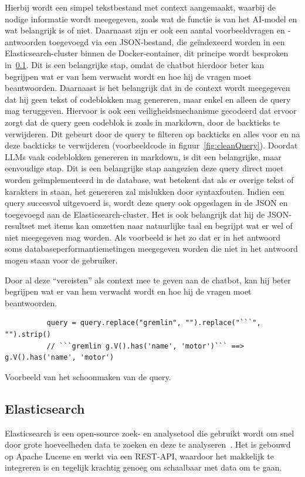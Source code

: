 Hierbij wordt een simpel tekstbestand met context aangemaakt, waarbij de nodige informatie wordt meegegeven, zoals wat de functie is van het AI-model en wat belangrijk is of niet.
Daarnaast zijn er ook een aantal voorbeeldvragen en -antwoorden toegevoegd via een JSON-bestand, die geïndexeerd worden in een Elasticsearch-cluster binnen de Docker-container, dit principe wordt besproken in~\ref{sec:Elasticsearch}.
Dit is een belangrijke stap, omdat de chatbot hierdoor beter kan begrijpen wat er van hem verwacht wordt en hoe hij de vragen moet beantwoorden.
Daarnaast is het belangrijk dat in de context wordt meegegeven dat hij geen tekst of codeblokken mag genereren, maar enkel en alleen de query mag teruggeven.
Hiervoor is ook een veiligheidsmechanisme gecodeerd dat ervoor zorgt dat de query geen codeblok is zoals in markdown, door de backticks te verwijderen.
Dit gebeurt door de query te filteren op backticks en alles voor en na deze backticks te verwijderen (voorbeeldcode in figuur~\ref{fig:cleanQuery}). Doordat LLMs vaak codeblokken genereren in markdown, is dit een belangrijke, maar eenvoudige stap.
Dit is een belangrijke stap aangezien deze query direct moet worden geïmplementeerd in de database, wat betekent dat als er overige tekst of karakters in staan, het genereren zal mislukken door syntaxfouten.
Indien een query succesvol uitgevoerd is, wordt deze query ook opgeslagen in de JSON en toegevoegd aan de Elasticsearch-cluster.
Het is ook belangrijk dat hij de JSON-resultset met items kan omzetten naar natuurlijke taal en begrijpt wat er wel of niet meegegeven mag worden.
Als voorbeeld is het zo dat er in het antwoord soms databaseperformantiemetingen meegegeven worden die niet in het antwoord mogen staan voor de gebruiker.

Door al deze ``vereisten'' als context mee te geven aan de chatbot, kan hij beter begrijpen wat er van hem verwacht wordt en hoe hij de vragen moet beantwoorden.

\begin{listing}[H]
     \begin{verbatim}
          query = query.replace("gremlin", "").replace("```", "").strip()
          // ```gremlin g.V().has('name', 'motor')``` ==> g.V().has('name', 'motor')
     \end{verbatim}
     \caption[Voorbeeld van het schoonmaken van de query]{\label{fig:cleanQuery}Voorbeeld van het schoonmaken van de query.}
\end{listing}

\subsection{Elasticsearch}\label{sec:Elasticsearch}
Elasticsearch is een open-source zoek- en analysetool die gebruikt wordt om snel door grote hoeveelheden data te zoeken en deze te analyseren~\autocite{Elastic2025}.
Het is gebouwd op Apache Lucene en werkt via een REST-API, waardoor het makkelijk te integreren is en tegelijk krachtig genoeg om schaalbaar met data om te gaan.

